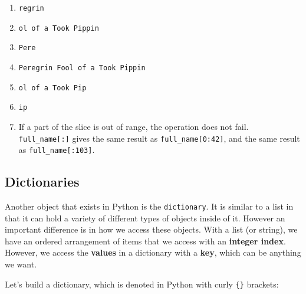 \documentclass[
  letterpaper,
  DIV=11,
  numbers=noendperiod]{scrreprt}
\providecommand{\tightlist}{%
  \setlength{\itemsep}{0pt}\setlength{\parskip}{0pt}}\usepackage{longtable,booktabs,array}
\begin{document}
\begin{tcolorbox}[enhanced jigsaw, rightrule=.15mm, opacitybacktitle=0.6, colback=white, toprule=.15mm, colframe=quarto-callout-note-color-frame, bottomtitle=1mm, bottomrule=.15mm, arc=.35mm, coltitle=black, breakable, title={Solution to Challenge 3}, titlerule=0mm, opacityback=0, colbacktitle=quarto-callout-note-color!10!white, left=2mm, toptitle=1mm, leftrule=.75mm]

\begin{enumerate}
\def\labelenumi{\arabic{enumi}.}
\tightlist
\item
  \texttt{\textquotesingle{}regrin\ \textquotesingle{}}
\item
  \texttt{\textquotesingle{}ol\ of\ a\ Took\ Pippin\textquotesingle{}}
\item
  \texttt{\textquotesingle{}Pere\textquotesingle{}}
\item
  \texttt{\textquotesingle{}Peregrin\ Fool\ of\ a\ Took\ Pippin\textquotesingle{}}
\item
  \texttt{\textquotesingle{}ol\ of\ a\ Took\ Pip\textquotesingle{}}
\item
  \texttt{\textquotesingle{}ip\textquotesingle{}}
\item
  If a part of the slice is out of range, the operation does not fail.
  \texttt{full\_name{[}:{]}} gives the same result as
  \texttt{full\_name{[}0:42{]}}, and the same result as
  \texttt{full\_name{[}:103{]}}.
\end{enumerate}

\end{tcolorbox}

\hypertarget{dictionaries}{%
\subsection{Dictionaries}\label{dictionaries}}

Another object that exists in Python is the \texttt{dictionary}. It is
similar to a list in that it can hold a variety of different types of
objects inside of it. However an important difference is in how we
access these objects. With a list (or string), we have an ordered
arrangement of items that we access with an \textbf{integer index}.
However, we access the \textbf{values} in a dictionary with a
\textbf{key}, which can be anything we want.

Let's build a dictionary, which is denoted in Python with curly
\texttt{\{\}} brackets:
\end{document}
